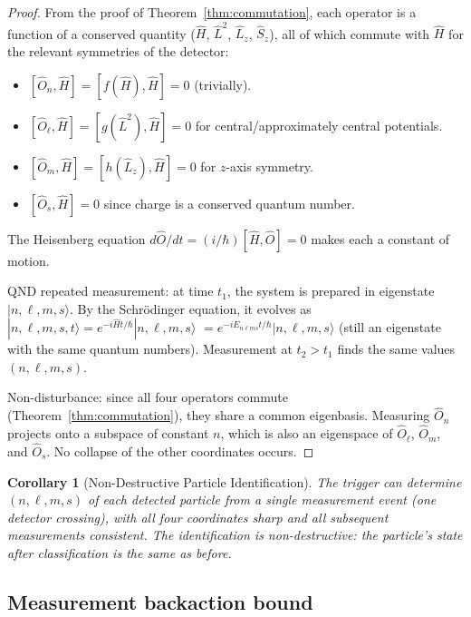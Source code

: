 \documentclass[twocolumn,10pt,a4paper]{article}
\theoremstyle{thmstyle}
\newtheorem{corollary}[theorem]{Corollary}
\theoremstyle{definition}
\theoremstyle{remark}
\begin{document}
\begin{proof}
From the proof of Theorem~\ref{thm:commutation}, each operator is a function
of a conserved quantity ($\hat{H}$, $\hat{L}^2$, $\hat{L}_z$, $\hat{S}_z$),
all of which commute with $\hat{H}$ for the relevant symmetries of the
detector:
\begin{itemize}[nosep]
\item $[\hat{O}_n, \hat{H}] = [f(\hat{H}), \hat{H}] = 0$ (trivially).
\item $[\hat{O}_\ell, \hat{H}] = [g(\hat{L}^2), \hat{H}] = 0$
for central/approximately central potentials.
\item $[\hat{O}_m, \hat{H}] = [h(\hat{L}_z), \hat{H}] = 0$ for
$z$-axis symmetry.
\item $[\hat{O}_s, \hat{H}] = 0$ since charge is a conserved quantum number.
\end{itemize}
The Heisenberg equation $d\hat{O}/dt = (i/\hbar)[\hat{H},\hat{O}] = 0$
makes each a constant of motion.

QND repeated measurement: at time $t_1$, the system is prepared in eigenstate
$|n,\ell,m,s\rangle$. By the Schrödinger equation, it evolves as
$|n,\ell,m,s,t\rangle = e^{-i\hat{H}t/\hbar}|n,\ell,m,s\rangle$
$= e^{-iE_{n\ell m s}t/\hbar}|n,\ell,m,s\rangle$ (still an eigenstate with the same
quantum numbers). Measurement at $t_2 > t_1$ finds the same values $(n,\ell,m,s)$.

Non-disturbance: since all four operators commute (Theorem~\ref{thm:commutation}),
they share a common eigenbasis. Measuring $\hat{O}_n$ projects onto a subspace
of constant $n$, which is also an eigenspace of $\hat{O}_\ell$, $\hat{O}_m$,
and $\hat{O}_s$. No collapse of the other coordinates occurs.
\end{proof}

\begin{corollary}[Non-Destructive Particle Identification]
\label{cor:nondestructive}
The trigger can determine $(n,\ell,m,s)$ of each detected particle from
a single measurement event (one detector crossing), with all four
coordinates sharp and all subsequent measurements consistent.
The identification is non-destructive: the particle's state after
classification is the same as before.
\end{corollary}

\subsection{Measurement backaction bound}
\end{document}
